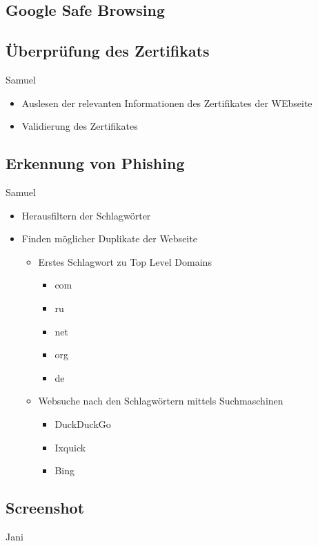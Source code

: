 \subsection{Google Safe Browsing}


\subsection{Überprüfung des Zertifikats}

\todo Samuel

\begin{itemize}
  \item Auslesen der relevanten Informationen des Zertifikates der WEbseite
  \item Validierung des Zertifikates
\end{itemize}

\subsection{Erkennung von Phishing}

\todo Samuel

\begin{itemize}
  \item Herausfiltern der Schlagwörter
  \item Finden möglicher Duplikate der Webseite
  \begin{itemize}
    \item Erstes Schlagwort zu Top Level Domains
    \begin{itemize}
      \item com
      \item ru
      \item net
      \item org
      \item de
    \end{itemize}
    \item Websuche nach den Schlagwörtern mittels Suchmaschinen
    \begin{itemize}
      \item DuckDuckGo
      \item Ixquick
      \item Bing
    \end{itemize}
  \end{itemize}
\end{itemize}

\subsection{Screenshot}

\todo Jani
